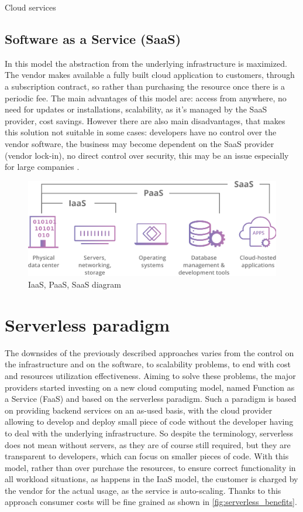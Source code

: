 \begin{chapter}{Cloud services}
    \subsection{Software as a Service (SaaS)}
    In this model the abstraction from the underlying infrastructure is maximized.
    The vendor makes available a fully built cloud application to customers, through
    a subscription contract, so rather than purchasing the resource once there is
    a periodic fee. The main advantages of this model are: access from anywhere,
    no need for updates or installations, scalability, as it's managed by the SaaS
    provider, cost savings.
    However there are also main disadvantages, that makes this solution not suitable
    in some cases: developers have no control over the vendor software, the business
    may become dependent on the SaaS provider (vendor lock-in), no direct control
    over security, this may be an issue especially for large companies \cite{saas}.

    \begin{figure}
        \centering
        \includegraphics[width=\linewidth]{source/images/saas-paas-iaas-diagram.png}
        \caption{IaaS, PaaS, SaaS diagram}
        \label{fig:cloud_computing_architectures}
    \end{figure}

    \section{Serverless paradigm}
    The downsides of the previously described approaches varies from the control on the
    infrastructure and on the software, to scalability problems, to end with cost
    and resources utilization effectiveness.
    Aiming to solve these problems, the major providers started investing on a new
    cloud computing model, named Function as a Service (FaaS) and based on the
    serverless paradigm.
    Such a paradigm is based on providing backend services on an as-used basis, with
    the cloud provider allowing to develop and deploy small piece of code without
    the developer having to deal with the underlying infrastructure.
    So despite the terminology, serverless does not mean without servers, as they are
    of course still required, but they are transparent to developers, which can focus
    on smaller pieces of code.
    With this model, rather than over purchase the resources, to ensure correct
    functionality in all workload situations, as happens in the IaaS model, the
    customer is charged by the vendor for the actual usage, as the service is
    auto-scaling. Thanks to this approach consumer costs will be fine grained as
    shown in \ref{fig:serverless_benefits}.


\end{chapter}
